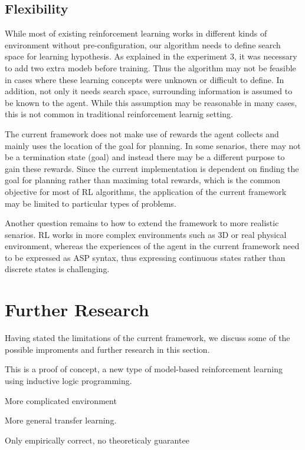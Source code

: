 \subsection{Flexibility}
While most of existing reinforcement learning works in different kinds of environment without pre-configuration, our algorithm
needs to define search space for learning hypothesis. As explained in the experiment 3, it was necessary to add two extra modeb before training.
Thus the algorithm may not be feasible in cases where these learning concepts were unknown or difficult to define. 
In addition, not only it needs search space, surrounding information is assumed to be known to the agent. 
While this assumption may be reasonable in many cases, this is not common in traditional reinforcement learnig setting.

The current framework does not make use of rewards the agent collects and mainly uses the location of the goal for planning.
In some senarios, there may not be a termination state (goal) and instead there may be a different purpose to gain these rewards. 
Since the current implementation is dependent on finding the goal for planning rather than maximing total rewards, which is the common objective for most of RL algorithms,
the application of the current framework may be limited to particular types of problems.

Another question remains to how to extend the framework to more realistic senarios. RL works in more complex environments such as 3D or real physical environment, 
whereas the experiences of the agent in the current framework need to be expressed as ASP syntax, thus expressing continuous states rather than discrete states is challenging.

\section{Further Research}
\label{further_research}

Having stated the limitations of the current framework, we discuss some of the possible improments and further research in this section.

This is a proof of concept, a new type of model-based reinforcement learning using inductive logic programming. 

More complicated environment

More general transfer learning.

Only empirically correct, no theoreticaly guarantee

